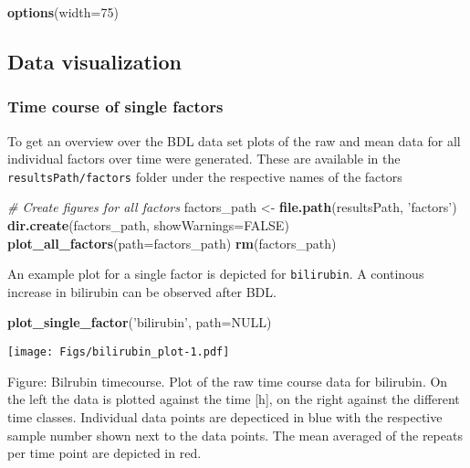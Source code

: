 \documentclass[]{article}
\newenvironment{Shaded}{\begin{snugshade}}{\end{snugshade}}
\newcommand{\KeywordTok}[1]{\textcolor[rgb]{0.13,0.29,0.53}{\textbf{{#1}}}}
\newcommand{\DataTypeTok}[1]{\textcolor[rgb]{0.13,0.29,0.53}{{#1}}}
\newcommand{\DecValTok}[1]{\textcolor[rgb]{0.00,0.00,0.81}{{#1}}}
\newcommand{\StringTok}[1]{\textcolor[rgb]{0.31,0.60,0.02}{{#1}}}
\newcommand{\CommentTok}[1]{\textcolor[rgb]{0.56,0.35,0.01}{\textit{{#1}}}}
\newcommand{\OtherTok}[1]{\textcolor[rgb]{0.56,0.35,0.01}{{#1}}}
\newcommand{\NormalTok}[1]{{#1}}
\begin{document}
\begin{Shaded}
\begin{Highlighting}[]
\KeywordTok{options}\NormalTok{(}\DataTypeTok{width=}\DecValTok{75}\NormalTok{)}
\end{Highlighting}
\end{Shaded}

\normalsize

\subsection{Data visualization}\label{data-visualization}

\subsubsection{Time course of single
factors}\label{time-course-of-single-factors}

To get an overview over the BDL data set plots of the raw and mean data
for all individual factors over time were generated. These are available
in the \texttt{resultsPath/factors} folder under the respective names of
the factors

\begin{Shaded}
\begin{Highlighting}[]
\CommentTok{# Create figures for all factors}
\NormalTok{factors_path <-}\StringTok{ }\KeywordTok{file.path}\NormalTok{(resultsPath, }\StringTok{'factors'}\NormalTok{)}
\KeywordTok{dir.create}\NormalTok{(factors_path, }\DataTypeTok{showWarnings=}\OtherTok{FALSE}\NormalTok{)}
\KeywordTok{plot_all_factors}\NormalTok{(}\DataTypeTok{path=}\NormalTok{factors_path)}
\KeywordTok{rm}\NormalTok{(factors_path)}
\end{Highlighting}
\end{Shaded}

An example plot for a single factor is depicted for \texttt{bilirubin}.
A continous increase in bilirubin can be observed after BDL.

\begin{Shaded}
\begin{Highlighting}[]
\KeywordTok{plot_single_factor}\NormalTok{(}\StringTok{'bilirubin'}\NormalTok{, }\DataTypeTok{path=}\OtherTok{NULL}\NormalTok{)}
\end{Highlighting}
\end{Shaded}

\texttt{[image: Figs/bilirubin\_plot-1.pdf]}

Figure: Bilrubin timecourse. Plot of the raw time course data for
bilirubin. On the left the data is plotted against the time {[}h{]}, on
the right against the different time classes. Individual data points are
depecticed in blue with the respective sample number shown next to the
data points. The mean averaged of the repeats per time point are
depicted in red.
\end{document}
